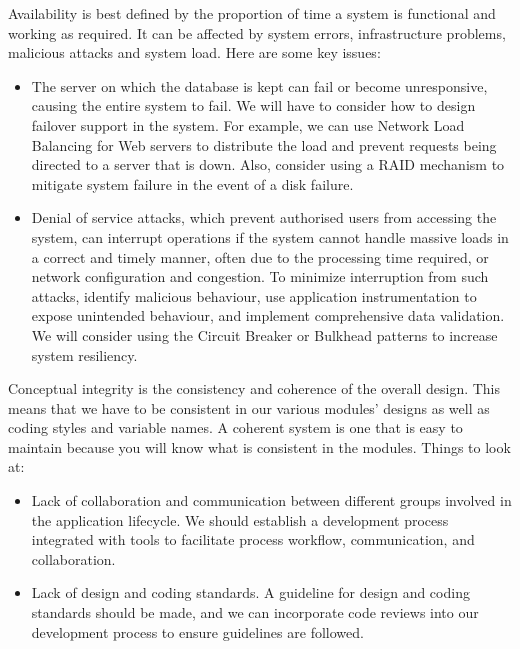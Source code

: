 \documentclass[11pt]{article}
\begin{document}
		Availability is best defined by the proportion of time a system is functional and working as required. It can be affected by system errors, infrastructure problems, malicious attacks and system load. Here are some key issues:
		\begin{itemize}
			\item The server on which the database is kept can fail or become unresponsive, causing the entire system to fail. We will have to consider how to design failover support in the system. For example, we can use Network Load Balancing for Web servers to distribute the load and prevent requests being directed to a server that is down. Also, consider using a RAID mechanism to mitigate system failure in the event of a disk failure.
			
			\item Denial of service attacks, which prevent authorised users from accessing the system, can interrupt operations if the system cannot handle massive loads in a correct and timely manner, often due to the processing time required, or network configuration and congestion. To minimize interruption from such attacks, identify malicious behaviour, use application instrumentation to expose unintended behaviour, and implement comprehensive data validation. We will consider using the Circuit Breaker or Bulkhead patterns to increase system resiliency.
		\end{itemize}
		
		Conceptual integrity is the consistency and coherence of the overall design. This means that we have to be consistent in our various modules’ designs as well as coding styles and variable names. A coherent system is one that is easy to maintain because you will know what is consistent in the modules. Things to look at:
		\begin{itemize}
			\item Lack of collaboration and communication between different groups involved in the application lifecycle. We should establish a development process integrated with tools to facilitate process workflow, communication, and collaboration.
			
			\item Lack of design and coding standards. A guideline for design and coding standards should be made, and we can incorporate code reviews into our development process to ensure guidelines are followed.
		\end{itemize}
		
\end{document}

